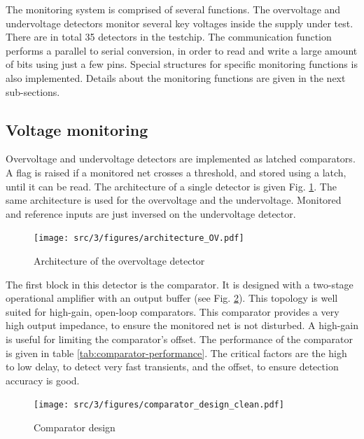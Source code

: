 The monitoring system is comprised of several functions.
The overvoltage and undervoltage detectors monitor several key voltages inside the supply under test.
There are in total 35 detectors in the testchip.
The communication function performs a parallel to serial conversion, in order to read and write a large amount of bits using just a few pins.
Special structures for specific monitoring functions is also implemented.
Details about the monitoring functions are given in the next sub-sections.

\subsection{Voltage monitoring}

Overvoltage and undervoltage detectors are implemented as latched comparators.
A flag is raised if a monitored net crosses a threshold, and stored using a latch, until it can be read.
The architecture of a single detector is given Fig. \ref{fig:architecture-ov}.
The same architecture is used for the overvoltage and the undervoltage.
Monitored and reference inputs are just inversed on the undervoltage detector.

\begin{figure}[!htbp]
  \centering
  \texttt{[image: src/3/figures/architecture\_OV.pdf]}
  \caption{Architecture of the overvoltage detector}
  \label{fig:architecture-ov}
\end{figure}

The first block in this detector is the comparator.
It is designed with a two-stage operational amplifier with an output buffer (see Fig. \ref{fig:comparator-design}).
This topology is well suited for high-gain, open-loop comparators.
This comparator provides a very high output impedance, to ensure the monitored net is not disturbed.
A high-gain is useful for limiting the comparator's offset.
The performance of the comparator is given in table \ref{tab:comparator-performance}.
The critical factors are the high to low delay, to detect very fast transients, and the offset, to ensure detection accuracy is good.

\begin{figure}[!htbp]
  \centering
  \texttt{[image: src/3/figures/comparator\_design\_clean.pdf]}
  \caption{Comparator design}
  \label{fig:comparator-design}
\end{figure}


